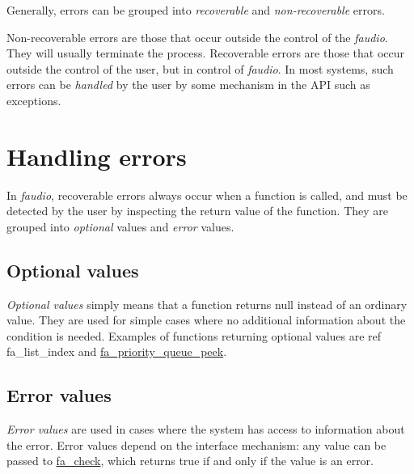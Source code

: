 \label{md__error_handling_Errors}%
\hypertarget{md__error_handling_Errors}{}%


Generally, errors can be grouped into {\itshape recoverable} and {\itshape non-\/recoverable} errors.

Non-\/recoverable errors are those that occur outside the control of the {\itshape faudio}. They will usually terminate the process. Recoverable errors are those that occur outside the control of the user, but in control of {\itshape faudio}. In most systems, such errors can be {\itshape handled} by the user by some mechanism in the A\-P\-I such as exceptions.\hypertarget{md__error_handling_id441}{}\section{Handling errors}\label{md__error_handling_id441}
In {\itshape faudio}, recoverable errors always occur when a function is called, and must be detected by the user by inspecting the return value of the function. They are grouped into {\itshape optional} values and {\itshape error} values.\hypertarget{md__error_handling_id1152}{}\subsection{Optional values}\label{md__error_handling_id1152}
{\itshape Optional values} simply means that a function returns null instead of an ordinary value. They are used for simple cases where no additional information about the condition is needed. Examples of functions returning optional values are ref fa\-\_\-list\-\_\-index and \hyperlink{group___fa_priority_queue_ga07dad7064b633feff9b9f8543173dcc0}{fa\-\_\-priority\-\_\-queue\-\_\-peek}.\hypertarget{md__error_handling_id24834}{}\subsection{Error values}\label{md__error_handling_id24834}
{\itshape Error values} are used in cases where the system has access to information about the error. Error values depend on the interface mechanism\-: any value can be passed to \hyperlink{group___fa_gaec61e23c174faf5e5244ae876d264eb5}{fa\-\_\-check}, which returns true if and only if the value is an error.

